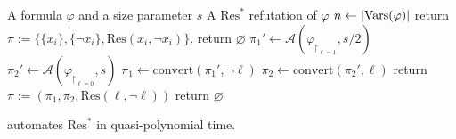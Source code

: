 \begin{algorithm}[H]
    \caption{An algorithm $\mathcal{A}$ that finds $\mathrm{Res}^*$ refutations}
    \label{algo:auto_treeres}
    \begin{algorithmic}
        \Require A formula $\varphi$ and a size parameter $s$
        \Ensure A $\mathrm{Res}^*$ refutation of $\varphi$
        \State $n \gets \left|\mathrm{Vars}(\varphi)\right|$
                \State return $\pi := \{\{x_i\}, \{\lnot x_i\}, \mathrm{Res}(x_i, \lnot x_i)\}$.
            \Else
                \State return $\varnothing$
            \EndIf
        \EndIf
            \State $\pi_1' \gets \mathcal{A}(\varphi_{\upharpoonright_{\ell = 1}}, s/2)$
                \State $\pi_2' \gets \mathcal{A}(\varphi_{\upharpoonright_{\ell = 0}}, s)$
                    \State $\pi_1 \gets \mathrm{convert}(\pi_1', \lnot \ell)$ 
                    \State $\pi_2 \gets \mathrm{convert}(\pi_2', \ell)$
                    \State return $\pi := (\pi_1, \pi_2, \mathrm{Res}(\ell, \lnot \ell))$
                \EndIf
            \EndIf
        \EndFor
        \State return $\varnothing$
    \end{algorithmic}
\end{algorithm}

\begin{theorem}
     automates $\mathrm{Res}^*$ in quasi-polynomial time.
\end{theorem}

